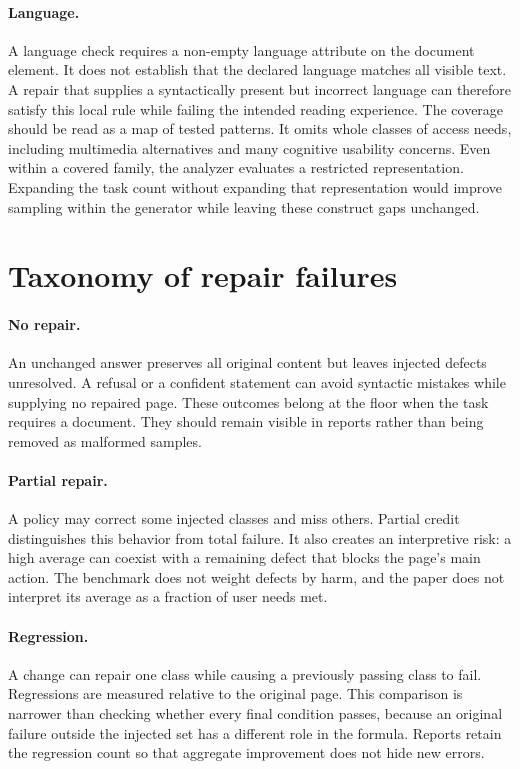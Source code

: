 \documentclass{article}
\begin{document}
\paragraph{Language.} A language check requires a non-empty language attribute on the document element. It does not establish that the declared language matches all visible text. A repair that supplies a syntactically present but incorrect language can therefore satisfy this local rule while failing the intended reading experience.
The coverage should be read as a map of tested patterns. It omits whole classes of access needs, including multimedia alternatives and many cognitive usability concerns. Even within a covered family, the analyzer evaluates a restricted representation. Expanding the task count without expanding that representation would improve sampling within the generator while leaving these construct gaps unchanged.


\section{Taxonomy of repair failures}
\paragraph{No repair.} An unchanged answer preserves all original content but leaves injected defects unresolved. A refusal or a confident statement can avoid syntactic mistakes while supplying no repaired page. These outcomes belong at the floor when the task requires a document. They should remain visible in reports rather than being removed as malformed samples.
\paragraph{Partial repair.} A policy may correct some injected classes and miss others. Partial credit distinguishes this behavior from total failure. It also creates an interpretive risk: a high average can coexist with a remaining defect that blocks the page's main action. The benchmark does not weight defects by harm, and the paper does not interpret its average as a fraction of user needs met.
\paragraph{Regression.} A change can repair one class while causing a previously passing class to fail. Regressions are measured relative to the original page. This comparison is narrower than checking whether every final condition passes, because an original failure outside the injected set has a different role in the formula. Reports retain the regression count so that aggregate improvement does not hide new errors.
\end{document}
